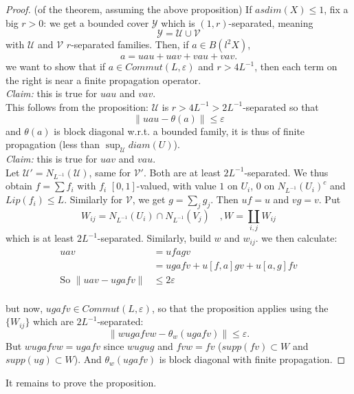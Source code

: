 \begin{proof}(of the theorem, assuming the above proposition)
If $asdim(X)\leq 1$, fix a big $r>0$: we get a bounded cover $\mathcal Y$ which is $(1,r)$-separated, meaning
\[\mathcal Y = \mathcal U \cup \mathcal V\]
with $\mathcal U$ and $\mathcal V$ $r$-separated families. Then, if $a\in B(l^2X)$,
\[a = uau + uav + vau + vav.\]
we want to show that if $a\in Commut (L,\varepsilon)$ and $r>4L^{-1}$, then each term on the right is near a finite propagation operator. \\

\textit{Claim:} this is true for $uau$ and $vav$. \\

This follows from the proposition: $\mathcal U$ is $r>4L^{-1}> 2L^{-1}$-separated so that
\[ \| uau -\theta(a) \| \leq \varepsilon \]
and $\theta(a)$ is block diagonal w.r.t. a bounded family, it is thus of finite propagation (less than $\sup_{\mathcal U} diam (U)$).\\

\textit{Claim:} this is true for $uav$ and $vau$.\\

Let $\mathcal U'=N_{L^{-1}}(\mathcal U)$, same for $\mathcal V'$. Both are at least $2L^{-1}$-separated. We thus obtain $f=\sum f_i$ with $f_i$ $[0,1]$-valued, with value $1$ on $U_i$, $0$ on $N_{L^{-1}}(U_i)^c$ and $Lip(f_i)\leq L$. Similarly for $\mathcal V$, we get $g=\sum_j g_j$. Then $uf=u$ and $vg=v$. Put 
\[W_{ij} = N_{L^{-1}}(U_i)\cap N_{L^{-1}}(V_j) \quad , W = \coprod_{i,j} W_{ij}\]
which is at least $2L^{-1}$-separated. Similarly, build $w$ and $w_{ij}$. we then calculate:
\[\begin{split} 
uav  &= ufagv \\
	&= ugafv +u [f,a]gv + u [a,g]fv \\
\text{So } \| uav-ugafv \| 	& \leq 2\varepsilon \\
\end{split}\]   

but now, $ugafv \in Commut(L,\varepsilon)$, so that the proposition applies using the $\{W_{ij}\}$ which are $2L^{-1}$-separated:
\[\| wugafvw -\theta_w(ugafv) \| \leq \varepsilon.\]
But $ wugafvw= ugafv$ since $wug ug $ and $fvw = fv $ ($supp (fv)\subset W$ and $supp(ug)\subset W$). And $\theta_w(ugafv)$ is block diagonal with finite propagation.
\end{proof}

It remains to prove the proposition. 

